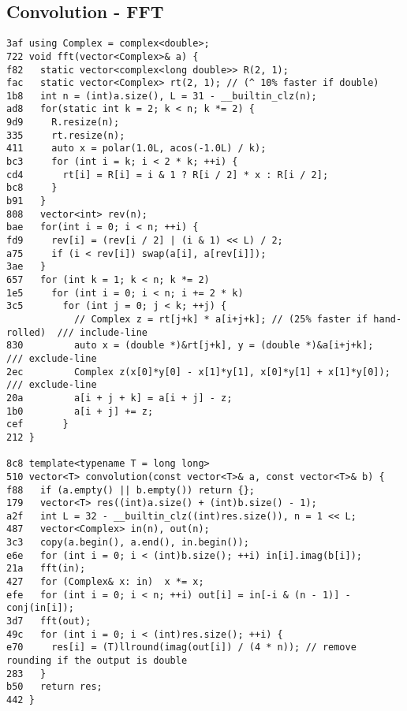 \documentclass[10pt, a4paper, twoside]{article}
\begin{document}
\subsection{Convolution - FFT}
\begin{lstlisting}
3af using Complex = complex<double>;
722 void fft(vector<Complex>& a) {
f82   static vector<complex<long double>> R(2, 1); 
fac   static vector<Complex> rt(2, 1); // (^ 10% faster if double)
1b8   int n = (int)a.size(), L = 31 - __builtin_clz(n);
ad8   for(static int k = 2; k < n; k *= 2) {
9d9     R.resize(n);
335     rt.resize(n);
411     auto x = polar(1.0L, acos(-1.0L) / k);
bc3     for (int i = k; i < 2 * k; ++i) {
cd4       rt[i] = R[i] = i & 1 ? R[i / 2] * x : R[i / 2];
bc8     }
b91   }
808   vector<int> rev(n);
bae   for(int i = 0; i < n; ++i) {
fd9     rev[i] = (rev[i / 2] | (i & 1) << L) / 2;
a75     if (i < rev[i]) swap(a[i], a[rev[i]]);
3ae   }
657   for (int k = 1; k < n; k *= 2)
1e5     for (int i = 0; i < n; i += 2 * k)
3c5       for (int j = 0; j < k; ++j) {
            // Complex z = rt[j+k] * a[i+j+k]; // (25% faster if hand-rolled)  /// include-line
830         auto x = (double *)&rt[j+k], y = (double *)&a[i+j+k];              /// exclude-line
2ec         Complex z(x[0]*y[0] - x[1]*y[1], x[0]*y[1] + x[1]*y[0]);           /// exclude-line
20a         a[i + j + k] = a[i + j] - z;
1b0         a[i + j] += z;
cef       }
212 }

8c8 template<typename T = long long>
510 vector<T> convolution(const vector<T>& a, const vector<T>& b) {
f88   if (a.empty() || b.empty()) return {};
179   vector<T> res((int)a.size() + (int)b.size() - 1);
a2f   int L = 32 - __builtin_clz((int)res.size()), n = 1 << L;
487   vector<Complex> in(n), out(n);
3c3   copy(a.begin(), a.end(), in.begin());
e6e   for (int i = 0; i < (int)b.size(); ++i) in[i].imag(b[i]);
21a   fft(in);
427   for (Complex& x: in)  x *= x;
efe   for (int i = 0; i < n; ++i) out[i] = in[-i & (n - 1)] - conj(in[i]);
3d7   fft(out);
49c   for (int i = 0; i < (int)res.size(); ++i) {
e70     res[i] = (T)llround(imag(out[i]) / (4 * n)); // remove rounding if the output is double
283   }
b50   return res;
442 }
\end{lstlisting}
\end{document}
